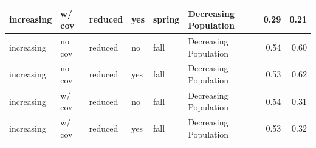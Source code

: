 \documentclass[
  12pt,
]{article}
\begin{document}
\begin{table}
\begin{tabular}{l|l|l|l|l|l|r|r}
\hline
\hspace{1em}\hspace{1em}increasing & w/ cov & reduced & yes & spring & Decreasing Population & 0.29 & 0.21\\
\hline
\hspace{1em}\hspace{1em}increasing & no cov & reduced & no & fall & Decreasing Population & 0.54 & 0.60\\
\hline
\hspace{1em}\hspace{1em}increasing & no cov & reduced & yes & fall & Decreasing Population & 0.53 & 0.62\\
\hline
\hspace{1em}\hspace{1em}increasing & w/ cov & reduced & no & fall & Decreasing Population & 0.54 & 0.31\\
\hline
\hspace{1em}\hspace{1em}increasing & w/ cov & reduced & yes & fall & Decreasing Population & 0.53 & 0.32\\
\hline
\end{tabular}
\endgroup{}
\end{table}
\end{document}
